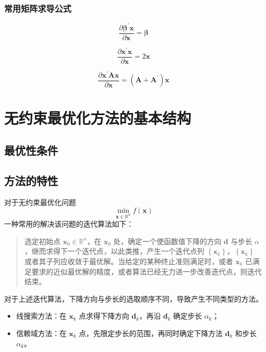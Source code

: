 \documentclass[cn,mtpro2,12pt]{elegantbook}
\begin{document}
\subsection{常用矩阵求导公式}

\begin{equation}
    \frac{\partial\boldsymbol{\beta}^{\prime}\mathbf{x}}{\partial\mathbf{x}}=\boldsymbol{\beta}
\end{equation}

\begin{equation}
    \frac{\partial\mathbf{x}^{\prime}\mathbf{x}}{\partial\mathbf{x}}=2\mathbf{x}
\end{equation}

\begin{equation}
    \frac{\partial\mathbf{x}^{\prime}\mathbf{A}\mathbf{x}}{\partial\mathbf{x}}=\left(\mathbf{A}+\mathbf{A}^{\prime}\right)\mathbf{x}
\end{equation}

\chapter{无约束最优化方法的基本结构}

\section{最优性条件}

\section{方法的特性}

对于无约束最优化问题
\begin{equation}
    \min_{\mathbf{x}\in\mathbb{R}^{n}}f\left(\mathbf{x}\right)
\end{equation}
一种常用的解决该问题的迭代算法如下：
\begin{quotation}
    选定初始点 $\mathbf{x}_{0}\in\mathbb{R}^{n}$，在 $\mathbf{x}_{0}$ 处，确定一个使函数值下降的方向 $\mathbf{d}$ 与步长 $\alpha$，继而求得下一个迭代点，以此类推，产生一个迭代点列 $\left\{\mathbf{x}_{k}\right\}$，$\left\{\mathbf{x}_{k}\right\}$ 或者其子列应收敛于最优解。当给定的某种终止准则满足时，或者 $\mathbf{x}_{k}$ 已满足要求的近似最优解的精度，或者算法已经无力进一步改善迭代点，则迭代结束。
\end{quotation}
\begin{remark}
    对于上述迭代算法，下降方向与步长的选取顺序不同，导致产生不同类型的方法。
    \begin{itemize}
        \item 线搜索方法：在 $\mathbf{x}_{k}$ 点求得下降方向 $\mathbf{d}_{k}$，再沿 $\mathbf{d}_{k}$ 确定步长 $\alpha_{k}$；
        \item 信赖域方法：在 $\mathbf{x}_{k}$ 点，先限定步长的范围，再同时确定下降方法 $\mathbf{d}_{k}$ 和步长 $\alpha_{k}$。
    \end{itemize}
\end{remark}
\end{document}
